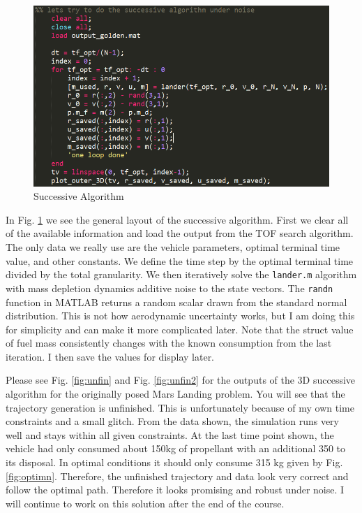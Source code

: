 \documentclass[journal]{new-aiaa}
\begin{document}
\begin{singlespace}
\begin{figure}[!htbp] 
  \centering
  \includegraphics[width=.75\textwidth]{succme.PNG}
  \caption{Successive Algorithm}
  \label{fig:succ}
\end{figure}

In Fig. \ref{fig:succ} we see the general layout of the successive algorithm. First we clear all of the available information and load the output from the TOF search algorithm. The only data we really use are the vehicle parameters, optimal terminal time value, and other constants. We define the time step by the optimal terminal time divided by the total granularity. We then iteratively solve the \texttt{lander.m} algorithm with mass depletion dynamics additive noise to the state vectors. The \texttt{randn} function in MATLAB returns a random scalar drawn from the standard normal distribution. This is not how aerodynamic uncertainty works, but I am doing this for simplicity and can make it more complicated later. Note that the struct value of fuel mass consistently changes with the known consumption from the last iteration. I then save the values for display later.

Please see Fig. \ref{fig:unfin} and Fig. \ref{fig:unfin2} for the outputs of the 3D successive algorithm for the originally posed Mars Landing problem. You will see that the trajectory generation is unfinished. This is unfortunately because of my own time constraints and a small glitch. From the data shown, the simulation runs very well and stays within all given constraints. At the last time point shown, the vehicle had only consumed about 150kg of propellant with an additional 350 to its disposal. In optimal conditions it should only consume 315 kg given by Fig. \ref{fig:optimn}. Therefore, the unfinished trajectory and data look very correct and follow the optimal path. Therefore it looks promising and robust under noise. I will continue to work on this solution after the end of the course. 



\end{singlespace}
\end{document}
